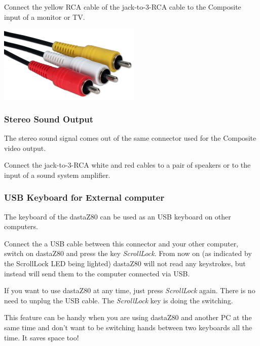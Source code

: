         Connect the yellow RCA cable of the jack-to-3-RCA cable to the Composite
        input of a monitor or TV.

        \centerline{\includegraphics[scale=0.5]{images/raspicable_rca.png}}

        \subsubsection{Stereo Sound Output}

        The stereo sound signal comes out of the same connector used for the
        Composite video output.

        Connect the jack-to-3-RCA white and red cables to a pair of speakers or
        to the input of a sound system amplifier.

        \subsubsection{USB Keyboard for External computer}

        The keyboard of the dastaZ80 can be used as an USB keyboard on other
        computers.
        
        Connect the a USB cable between this connector and your other
        computer, switch on dastaZ80 and press the key \textit{ScrollLock}. From
        now on (as indicated by the ScrollLock LED being lighted) dastaZ80 will
        not read any keystrokes, but instead will send them to the computer
        connected via USB.

        If you want to use dastaZ80 at any time, just press \textit{ScrollLock}
        again. There is no need to unplug the USB cable. The \textit{ScrollLock}
        key is doing the switching.

        This feature can be handy when you are using dastaZ80 and another PC at
        the same time and don't want to be switching hands between two keyboards
        all the time. It saves space too!

